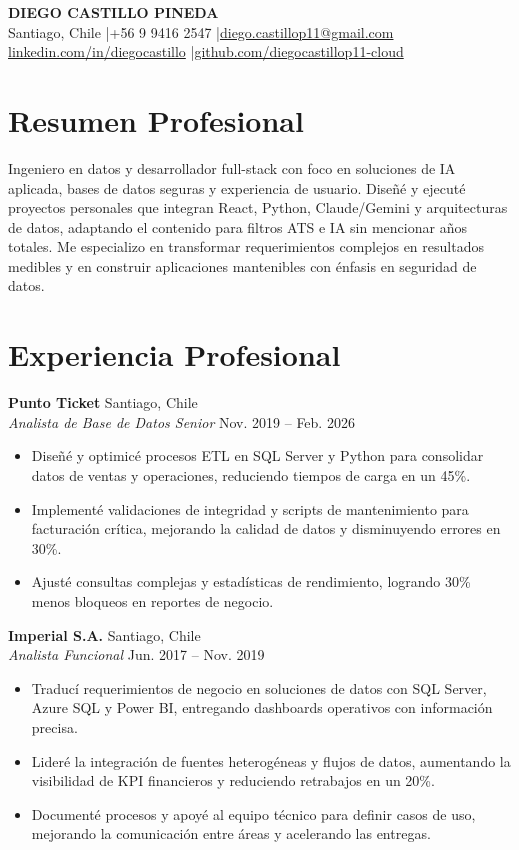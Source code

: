 \documentclass[11pt,letterpaper]{article}
\begin{document}
\begin{center}
{\fontsize{16}{19}\selectfont\textbf{DIEGO CASTILLO PINEDA}}\\[4pt]
{\small Santiago, Chile \quad|\quad +56 9 9416 2547 \quad|\quad \href{mailto:diego.castillop11@gmail.com}{diego.castillop11@gmail.com} \\
\href{https://linkedin.com/in/diegocastillo}{linkedin.com/in/diegocastillo} \quad|\quad \href{https://github.com/diegocastillop11-cloud}{github.com/diegocastillop11-cloud}}
\end{center}

\section{Resumen Profesional}
Ingeniero en datos y desarrollador full-stack con foco en soluciones de IA aplicada, bases de datos seguras y experiencia de usuario. Diseñé y ejecuté proyectos personales que integran React, Python, Claude/Gemini y arquitecturas de datos, adaptando el contenido para filtros ATS e IA sin mencionar años totales. Me especializo en transformar requerimientos complejos en resultados medibles y en construir aplicaciones mantenibles con énfasis en seguridad de datos.

\section{Experiencia Profesional}
\textbf{Punto Ticket} \hfill Santiago, Chile\\
\textit{Analista de Base de Datos Senior} \hfill Nov. 2019 -- Feb. 2026
\begin{itemize}
  \item Diseñé y optimicé procesos ETL en SQL Server y Python para consolidar datos de ventas y operaciones, reduciendo tiempos de carga en un 45\%.
  \item Implementé validaciones de integridad y scripts de mantenimiento para facturación crítica, mejorando la calidad de datos y disminuyendo errores en 30\%.
  \item Ajusté consultas complejas y estadísticas de rendimiento, logrando 30\% menos bloqueos en reportes de negocio.
\end{itemize}

\textbf{Imperial S.A.} \hfill Santiago, Chile\\
\textit{Analista Funcional} \hfill Jun. 2017 -- Nov. 2019
\begin{itemize}
  \item Traducí requerimientos de negocio en soluciones de datos con SQL Server, Azure SQL y Power BI, entregando dashboards operativos con información precisa.
  \item Lideré la integración de fuentes heterogéneas y flujos de datos, aumentando la visibilidad de KPI financieros y reduciendo retrabajos en un 20\%.
  \item Documenté procesos y apoyé al equipo técnico para definir casos de uso, mejorando la comunicación entre áreas y acelerando las entregas.
\end{itemize}
\end{document}
